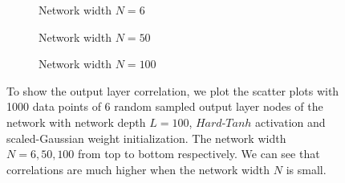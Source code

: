 \begin{figure}
\centering
\newcommand{\myWidth}{.9\textwidth}
\begin{subfigure}{\myWidth}
  \centering
  \caption{Network width $N=6$}
  \label{fig:sec4_sim1_a}
\end{subfigure}%

\begin{subfigure}{\myWidth}
  \centering
  \caption{Network width $N=50$}
  \label{fig:sec4_sim1_b}
\end{subfigure}%

\begin{subfigure}{\myWidth}
  \centering
  \caption{Network width $N=100$}
  \label{fig:sec4_sim1_c}
\end{subfigure}%

\caption[Scatter plots of output layer nodes.]{To show the output layer correlation, we plot the scatter plots with 1000 data points of 6 random sampled output layer nodes of the network with network depth $L=100$, $Hard\text{-}Tanh$ activation and scaled-Gaussian weight initialization. The network width $N=6, 50, 100$ from top to bottom respectively. We can see that correlations are much higher when the network width $N$ is small.}
\label{fig:sec4_sim1}
\end{figure}